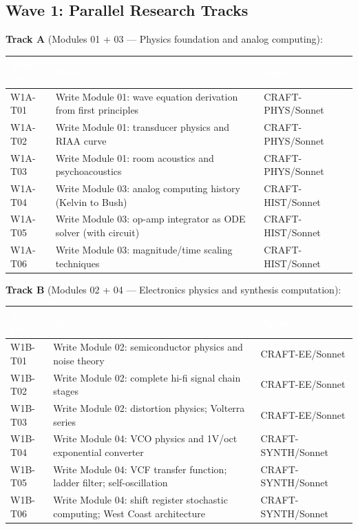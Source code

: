 \documentclass[11pt,letterpaper]{article}
\newcommand{\tableheader}[1]{\textbf{\sffamily\textcolor{white}{#1}}}
\begin{document}
\subsection{Wave 1: Parallel Research Tracks}

\textbf{Track A} (Modules 01 + 03 --- Physics foundation and analog computing):

\begin{center}
\begin{tabularx}{\textwidth}{L{2.5cm}XC{2cm}}
\toprule
{}
\tableheader{Task ID} & \tableheader{Task} & \tableheader{Agent} \\
\midrule
W1A-T01 & Write Module 01: wave equation derivation from first principles & CRAFT-PHYS/Sonnet \\
W1A-T02 & Write Module 01: transducer physics and RIAA curve & CRAFT-PHYS/Sonnet \\
W1A-T03 & Write Module 01: room acoustics and psychoacoustics & CRAFT-PHYS/Sonnet \\
W1A-T04 & Write Module 03: analog computing history (Kelvin to Bush) & CRAFT-HIST/Sonnet \\
W1A-T05 & Write Module 03: op-amp integrator as ODE solver (with circuit) & CRAFT-HIST/Sonnet \\
W1A-T06 & Write Module 03: magnitude/time scaling techniques & CRAFT-HIST/Sonnet \\
\bottomrule
\end{tabularx}
\end{center}

\textbf{Track B} (Modules 02 + 04 --- Electronics physics and synthesis computation):

\begin{center}
\begin{tabularx}{\textwidth}{L{2.5cm}XC{2cm}}
\toprule
{}
\tableheader{Task ID} & \tableheader{Task} & \tableheader{Agent} \\
\midrule
W1B-T01 & Write Module 02: semiconductor physics and noise theory & CRAFT-EE/Sonnet \\
W1B-T02 & Write Module 02: complete hi-fi signal chain stages & CRAFT-EE/Sonnet \\
W1B-T03 & Write Module 02: distortion physics; Volterra series & CRAFT-EE/Sonnet \\
W1B-T04 & Write Module 04: VCO physics and 1V/oct exponential converter & CRAFT-SYNTH/Sonnet \\
W1B-T05 & Write Module 04: VCF transfer function; ladder filter; self-oscillation & CRAFT-SYNTH/Sonnet \\
W1B-T06 & Write Module 04: shift register stochastic computing; West Coast architecture & CRAFT-SYNTH/Sonnet \\
\bottomrule
\end{tabularx}
\end{center}
\end{document}
